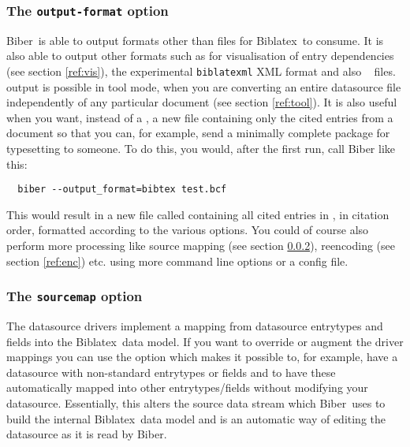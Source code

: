 \documentclass{ltxdockit}
\newcommand*{\biber}{Biber\xspace}
\newcommand*{\biblatex}{Biblatex\xspace}
\begin{document}
\subsubsection{The \texttt{output-format} option}\label{ref:of}

\biber\ is able to output formats other than  files for \biblatex\
to consume. It is also able to output other formats such as  for
visualisation of entry dependencies (see section \ref{ref:vis}), the
experimental \verb+biblatexml+ XML format and also \bibtex\  files.
\file{.bib} output is possible in tool mode, when you are converting an
entire datasource file independently of any particular document (see
section \ref{ref:tool}). It is also useful when you want, instead of a
\file{.bbl}, a new \file{.bib} file containing only the cited entries from
a document so that you can, for example, send a minimally complete package
for typesetting to someone. To do this, you would, after the first \latex
run, call \biber like this:

\begin{verbatim}
  biber --output_format=bibtex test.bcf
\end{verbatim}

\noindent This would result in a new  file called
 containing all cited entries in , in
citation order, formatted according to the various \opt{ouput-*} options.
You could of course also perform more processing like source mapping
(see section \ref{ref:map}), reencoding (see section \ref{ref:enc}) etc. using more
command line options or a config file.

\subsubsection{The \texttt{sourcemap} option}\label{ref:map}

The datasource drivers implement a mapping from datasource
entrytypes and fields into the \biblatex\ data model. If you want to
override or augment the driver mappings you can use the
 option which makes it possible to, for example, have a
datasource with non-standard entrytypes or fields and to have these
automatically mapped into other entrytypes/fields without modifying
your datasource.  Essentially, this alters the source data stream
which \biber\ uses to build the internal \biblatex\ data model and is an
automatic way of editing the datasource as it is read by \biber.
\end{document}

